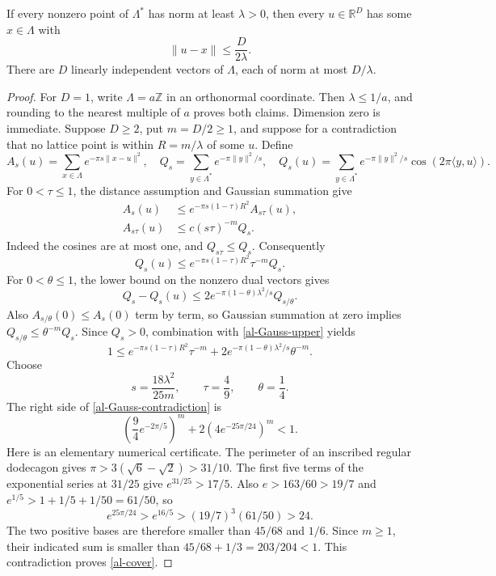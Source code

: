 \begin{theorem}\label{al-transference}
If every nonzero point of $\Lambda^*$ has norm at least
$\lambda>0$, then every $u\in\mathbb R^D$ has some
$x\in\Lambda$ with
\begin{equation}\label{al-cover}
                         \|u-x\|\leq\frac D{2\lambda}.
\end{equation}
There are $D$ linearly independent vectors of $\Lambda$, each
of norm at most $D/\lambda$.
\end{theorem}
\begin{proof}
For $D=1$, write $\Lambda=a\mathbb Z$ in an orthonormal coordinate.
Then $\lambda\leq1/a$, and rounding to the nearest multiple of
$a$ proves both claims. Dimension zero is immediate.
Suppose $D\geq2$, put $m=D/2\geq1$, and suppose for a
contradiction that no lattice point is within $R=m/\lambda$
of some $u$. Define
\[
 A_s(u)=\sum_{x\in\Lambda}e^{-\pi s\|x-u\|^2},\quad
 Q_s=\sum_{y\in\Lambda^*}e^{-\pi\|y\|^2/s},\quad
 Q_s(u)=\sum_{y\in\Lambda^*}e^{-\pi\|y\|^2/s}
                              \cos(2\pi\langle y,u\rangle).
\]
For $0<\tau\leq1$, the distance assumption and Gaussian summation
give
\begin{align*}
 A_s(u)&\leq e^{-\pi s(1-\tau)R^2}A_{s\tau}(u),\\
 A_{s\tau}(u)&\leq c(s\tau)^{-m}Q_s.
\end{align*}
Indeed the cosines are at most one, and $Q_{s\tau}\leq Q_s$.
Consequently
\begin{equation}\label{al-Gauss-upper}
       Q_s(u)\leq e^{-\pi s(1-\tau)R^2}\tau^{-m}Q_s.
\end{equation}
For $0<\theta\leq1$, the lower bound on the nonzero dual vectors
gives
\[
 Q_s-Q_s(u)
 \leq2e^{-\pi(1-\theta)\lambda^2/s}Q_{s/\theta}.
\]
Also $A_{s/\theta}(0)\leq A_s(0)$ term by term, so Gaussian
summation at zero implies
$Q_{s/\theta}\leq\theta^{-m}Q_s$.
Since $Q_s>0$, combination with \eqref{al-Gauss-upper} yields
\begin{equation}\label{al-Gauss-contradiction}
 1\leq e^{-\pi s(1-\tau)R^2}\tau^{-m}
               +2e^{-\pi(1-\theta)\lambda^2/s}\theta^{-m}.
\end{equation}
Choose
\[
       s=\frac{18\lambda^2}{25m},\qquad
       \tau=\frac49,\qquad\theta=\frac14.
\]
The right side of \eqref{al-Gauss-contradiction} is
\[
 \left(\frac94e^{-2\pi/5}\right)^m
          +2\left(4e^{-25\pi/24}\right)^m<1.
\]
Here is an elementary numerical certificate. The perimeter of
an inscribed regular dodecagon gives
$\pi>3(\sqrt6-\sqrt2)>31/10$.
The first five terms of the exponential series at $31/25$
give $e^{31/25}>17/5$. Also
$e>163/60>19/7$ and
$e^{1/5}>1+1/5+1/50=61/50$, so
\[
 e^{25\pi/24}>e^{16/5}
   >(19/7)^3(61/50)>24.
\]
The two positive bases are therefore smaller than $45/68$ and
$1/6$. Since $m\geq1$, their indicated sum is smaller than
$45/68+1/3=203/204<1$. This contradiction proves
\eqref{al-cover}.


\end{proof}
